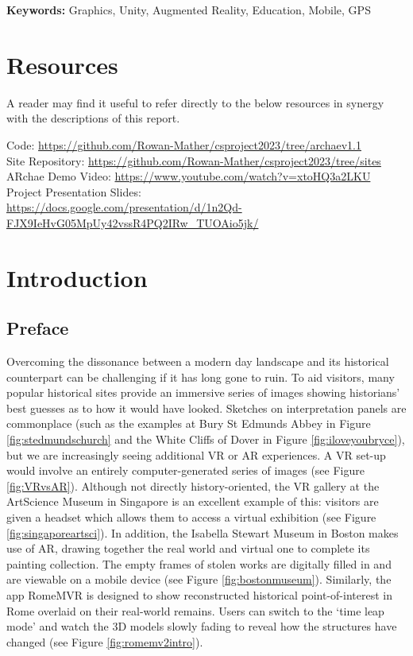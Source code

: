 \documentclass[12pt, a4paper]{article}
\begin{document}
\begin{center}
\textbf{Keywords:} Graphics, Unity, Augmented Reality, Education, Mobile, GPS
\end{center}

\newpage

\printglossary

\section*{Resources}
A reader may find it useful to refer directly to the below resources in synergy with the descriptions of this report.

Code: \url{https://github.com/Rowan-Mather/csproject2023/tree/archaev1.1} \cite{tools:repo} \\
Site Repository: \url{https://github.com/Rowan-Mather/csproject2023/tree/sites} \cite{tools:repo} \\
ARchae Demo Video: \url{https://www.youtube.com/watch?v=xtoHQ3a2LKU} \cite{design:videodemo} \\
Project Presentation Slides: \\
\url{https://docs.google.com/presentation/d/1n2Qd-FJX9IeHvG05MpUy42vssR4PQ2IRw_TUOAio5jk/}

\newpage

\tableofcontents

\newpage

\section{Introduction}

\subsection{Preface}
Overcoming the dissonance between a modern day landscape and its historical counterpart can be challenging if it has long gone to ruin. To aid visitors, many popular historical sites provide an immersive series of images showing historians' best guesses as to how it would have looked. Sketches on interpretation panels are commonplace (such as the examples at Bury St Edmunds Abbey in Figure \ref{fig:stedmundschurch} and the White Cliffs of Dover in Figure \ref{fig:iloveyoubryce}), but we are increasingly seeing additional \gls{VR} or \gls{AR} experiences. A VR set-up would involve an entirely computer-generated series of images (see Figure \ref{fig:VRvsAR}). Although not directly history-oriented, the VR gallery at the ArtScience Museum in Singapore is an excellent example of this: visitors are given a headset which allows them to access a virtual exhibition (see Figure \ref{fig:singaporeartsci}). In addition, the Isabella Stewart Museum in Boston makes use of AR, drawing together the real world and virtual one to complete its painting collection. The empty frames of stolen works are digitally filled in and are viewable on a mobile device (see Figure \ref{fig:bostonmuseum}). Similarly, the app RomeMVR is designed to show reconstructed historical point-of-interest in Rome overlaid on their real-world remains. Users can switch to the `time leap mode' and watch the 3D models slowly fading to reveal how the structures have changed (see Figure \ref{fig:romemv2intro}). 
\end{document}
